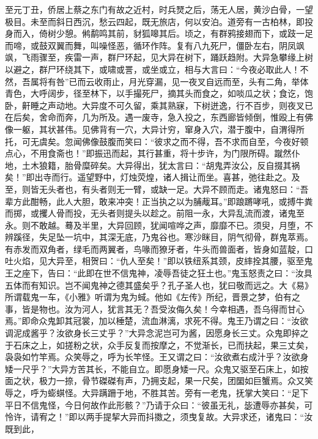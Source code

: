 \documentclass[a4paper,12pt,UTF8,twoside]{ctexbook}
\begin{document}
至元丁丑，侨居上蔡之东门有故之近村，时兵燹之后，荡无人居，黄沙白骨，一望极目。未至而斜日西沉，愁云四起，既无旅店，何以安泊。道旁有一古柏林，即投身而入，倚树少憩。鸺鹬鸣其前，豺狐嗥其后。顷之，有群鸦接翅而下，或跂一足而啼，或鼓双翼而舞，叫噪怪恶，循环作阵。复有八九死尸，僵卧左右，阴凤飒飒，飞雨骤至，疾雷一声，群尸环起，见大异在树下，踊跃趋附。大异急攀缘上树以避之，群尸环绕其下，或啸或詈，或坐或立，相与大言曰：“今夜必取此人！不然，吾属将有咎”已而云收雨止，月光穿漏，见一夜叉自远而至，头有二角，举体青色，大呼阔步，径至林下，以手撮死尸，摘其头而食之，如啖瓜之状；食讫，饱卧，鼾睡之声动地。大异度不可久留，乘其熟寐，下树迸逸，行不百步，则夜叉已在后矣，舍命而奔，几为所及。遇一废寺，急入投之，东西廊皆倾倒，惟殴上有佛像一躯，其状甚伟。见佛背有一穴，大异计穷，窜身入穴，潜于腹中，自渭得所托，可无虞矣。忽闻佛像鼓腹而笑曰：“彼求之而不得，吾不求而自至，今夜好顿点心，不用食斋也！”即振迅而起，其行甚重，将十步许，为门限所碍。蹴然仆地，土木狼籍，胎骨糜碎矣。大异得出，犹太言曰：“胡鬼弄汝公，反自掇其祸矣！”即出寺而行。遥望野中，灯烛荧煌，诸人揖让而坐。喜甚，弛往赴之。及至，则皆无头者也，有头者则无一臂，或缺一足。大异不顾而走。诸鬼怒曰：“吾辈方此酣畅，此人大胆，敢来冲突！正当执之以为脯胾耳。”即踉蹡哮吼，或搏牛粪而掷，或攫人骨而投，无头者则提头以趁之。前阻一永，大异乱流而渡，诸鬼至永。则不敢越。蓦及半里，大异回顾，犹闻喧哗之声，靡靡不已。须臾，月堕，不辨蹊径，失足坠一坑中，其深无底，乃鬼谷也。寒沙眯目，阴气彻骨，群鬼萃焉。有赤发而双角者，绿毛而两翼者，鸟喙而獠牙者，牛头而兽面者，皆身如蓝靛，口吐火焰，见大异至，相贺曰：“仇人至矣！”即以铁纽系其颈，皮繂拴其腰，驱至鬼王之座下，告曰：“此即在世不信鬼神，凌辱吾徒之狂土也。”鬼玉怒责之曰：“汝具五体而有知识。岂不闻鬼神之德其盛矣乎？孔子圣人也，犹曰敬而远之。大《易》所谓载鬼一车，《小雅》听谓为鬼为蜮。他如《左传》所纪，晋景之梦，伯有之事，皆是物也。汝为河人，犹言其无？吾受汝侮久矣！今幸相遇，吾乌得而甘心焉。”即命众鬼卸其冠裳，加以棰楚，流血淋漓，求死不得。鬼王乃谓之曰：“汝欲调泥成酱乎？汝欲身长三丈乎？”大异念泥岂可为酱，因愿身长三丈。众鬼即捽之于石床之上，如搓粉之状，众手反复而按摩之，不觉渐长，已而扶起，果三丈矣，袅袅如竹竿焉。众笑辱之，呼为长竿怪。王又谓之曰：“汝欲煮右成汁乎？汝欲身矮一尺乎？”大异方苦其长，不能自立。即愿身矮一尺。众鬼又驱至石床上，如按面之状，极力一捺，骨节磔磔有声，乃拥支起，果一尺矣，团圞如巨蟹焉。众又笑辱之，呼为蟛蜞怪。大异蹒跚于地，不胜其苦。旁有一老鬼，抚掌大笑曰：“足下平日不信鬼怪，今日何故作此形骸？”乃请于众曰：“彼虽无礼，毖遭辱亦甚矣，可怜许，请宥之！”即以两手提挈大异而抖擞之，须曳复故。大异求还，诸鬼曰：“汝既到此，
\end{document}
